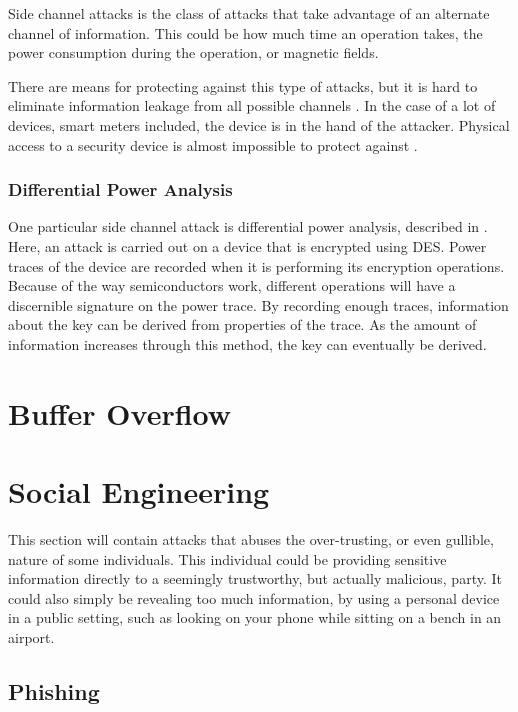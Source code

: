 Side channel attacks is the class of attacks that take advantage of an alternate channel of information.
This could be how much time an operation takes, the power consumption during the operation, or magnetic fields.

There are means for protecting against this type of attacks, but it is hard to eliminate information leakage from all possible channels \citep[p.~132]{cryptoenginering}.
In the case of a lot of devices, smart meters included, the device is in the hand of the attacker.
Physical access to a security device is almost impossible to protect against \citep[p.~132]{cryptoenginering}.

\subsubsection{Differential Power Analysis}\label{attack:dpa}
One particular side channel attack is differential power analysis, described in \citet{DPA}.
Here, an attack is carried out on a device that is encrypted using DES.
Power traces of the device are recorded when it is performing its encryption operations.
Because of the way semiconductors work, different operations will have a discernible signature on the power trace.
By recording enough traces, information about the key can be derived from properties of the trace.
As the amount of information increases through this method, the key can eventually be derived.



\section{Buffer Overflow}\label{attack:bufferoverflow}


\section{Social Engineering}
This section will contain attacks that abuses the over-trusting, or even gullible, nature of some individuals.
This individual could be providing sensitive information directly to a seemingly trustworthy, but actually malicious, party.
It could also simply be revealing too much information, by using a personal device in a public setting, such as looking on your phone while sitting on a bench in an airport.

\subsection{Phishing}\label{attack:phishing}

